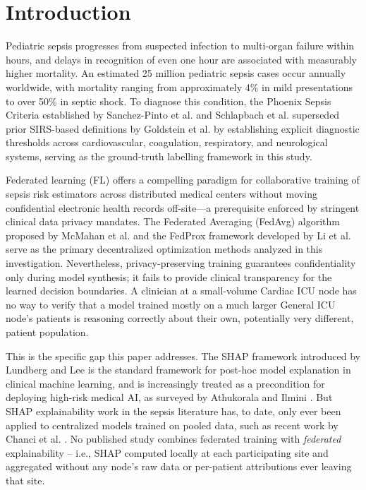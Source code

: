 \documentclass{svproc}
\begin{document}
\section{Introduction}\label{sec:intro}

Pediatric sepsis progresses from suspected infection to multi-organ failure within hours, and delays in recognition of even one hour are associated with measurably higher mortality. An estimated 25 million pediatric sepsis cases occur annually worldwide, with mortality ranging from approximately 4\% in mild presentations to over 50\% in septic shock. To diagnose this condition, the Phoenix Sepsis Criteria established by Sanchez-Pinto et al. \cite{sanchezpinto2024phoenix} and Schlapbach et al. \cite{schlapbach2024phoenix} superseded prior SIRS-based definitions by Goldstein et al. \cite{goldstein2005sirs} by establishing explicit diagnostic thresholds across cardiovascular, coagulation, respiratory, and neurological systems, serving as the ground-truth labelling framework in this study.

Federated learning (FL) offers a compelling paradigm for collaborative training of sepsis risk estimators across distributed medical centers without moving confidential electronic health records off-site---a prerequisite enforced by stringent clinical data privacy mandates. The Federated Averaging (FedAvg) algorithm proposed by McMahan et al. \cite{mcmahan2017fedavg} and the FedProx framework developed by Li et al. \cite{li2020fedprox} serve as the primary decentralized optimization methods analyzed in this investigation. Nevertheless, privacy-preserving training guarantees confidentiality only during model synthesis; it fails to provide clinical transparency for the learned decision boundaries. A clinician at a small-volume Cardiac ICU node has no way to verify that a model trained mostly on a much larger General ICU node's patients is reasoning correctly about their own, potentially very different, patient population.

This is the specific gap this paper addresses. The SHAP framework introduced by Lundberg and Lee \cite{lundberg2017shap} is the standard framework for post-hoc model explanation in clinical machine learning, and is increasingly treated as a precondition for deploying high-risk medical AI, as surveyed by Athukorala and Ilmini \cite{athukorala2026explainable}. But SHAP explainability work in the sepsis literature has, to date, only ever been applied to centralized models trained on pooled data, such as recent work by Chanci et al. \cite{chanci2025machine}. No published study combines federated training with \emph{federated} explainability -- i.e., SHAP computed locally at each participating site and aggregated without any node's raw data or per-patient attributions ever leaving that site.
\end{document}
